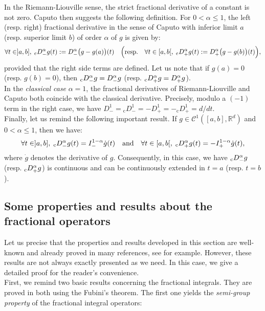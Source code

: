 \documentclass[english,11pt,reqno]{smfart}
\newcommand{\R}{\mathbb{R}}
\newcommand{\CC}{\mathscr{C}}
\newcommand{\cDM}{{}_{{\rm c}} D^\alpha_-}
\newcommand{\cDP}{{}_{{\rm c}} D^\alpha_+}
\newcommand{\DM}{D^\alpha_-}
\newcommand{\DP}{D^\alpha_+}
\begin{document}
In the Riemann-Liouville sense, the strict fractional derivative of a constant is not zero. Caputo then suggests the following definition. For $0 < \alpha \leq 1$, the left (resp. right) fractional derivative in the sense of Caputo with inferior limit $a$ (resp. superior limit $b$) of order $\alpha $ of $g$ is given by:
\begin{equation}
\forall t \in ]a,b], \; \cDM g(t) := \DM \big( g - g(a) \big) (t) \quad \Big( \text{resp.} \quad \forall t \in [a,b[, \; \cDP g(t) := \DP \big( g - g(b) \big) (t) \Big),
\end{equation}
provided that the right side terms are defined. Let us note that if $g(a)=0$ (resp. $g(b)=0$), then $\cDM g = \DM g$ (resp. $\cDP g =  \DP g$).\\

In the \textit{classical case} $\alpha = 1$, the fractional derivatives of Riemann-Liouville and Caputo both coincide with the classical derivative. Precisely, modulo a $(-1)$ term in the right case, we have $D^1_- = {}_{\text{c}}D^1_- = - D^1_+ = - {}_{\text{c}}D^1_+ = d/dt$. \\

Finally, let us remind the following important result. If $g \in \CC^1 ([a,b],\R^d)$ and $0 < \alpha \leq 1$, then we have:
\begin{equation}\label{eq11-1}
\forall t \in ]a,b], \; \cDM g(t) =  I^{1-\alpha}_- \dot{g} (t) \quad \text{and} \quad \forall t \in [a,b[, \; \cDP g(t) = - I^{1-\alpha}_+ \dot{g} (t) ,
\end{equation}
where $\dot{g} $ denotes the derivative of $g$. Consequently, in this case, we have $\cDM g$ (resp. $\cDP g$) is continuous and can be continuously extended in $t=a$ (resp. $t=b$). 

\subsection{Some properties and results about the fractional operators}\label{section12}
Let us precise that the properties and results developed in this section are well-known and already proved in many references, see \cite{kilb,samk} for example. However, these results are not always exactly presented as we need. In this case, we give a detailed proof for the reader's convenience. \\

First, we remind two basic results concerning the fractional integrals. They are proved in \cite{kilb,samk} both using the Fubini's theorem. The first one yields the \textit{semi-group property} of the fractional integral operators:
\end{document}
